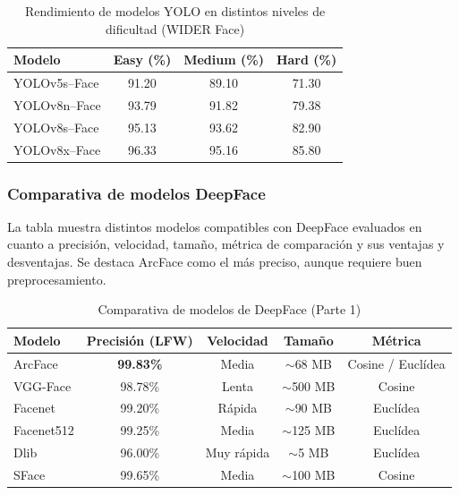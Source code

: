 \begin{table}[H]
    \centering
    \caption{Rendimiento de modelos YOLO en distintos niveles de dificultad (WIDER Face)}
    \label{tab:rendimiento_dificultad}
    \renewcommand{\arraystretch}{1.3}
    \scriptsize
    \begin{tabular}{|p{3.5cm}|c|c|c|}
        \hline
        \textbf{Modelo} & \textbf{Easy (\%)} & \textbf{Medium (\%)} & \textbf{Hard (\%)} \\
        \hline
        YOLOv5s–Face & 91.20 & 89.10 & 71.30 \\
        \hline
        YOLOv8n–Face & 93.79 & 91.82 & 79.38 \\
        \hline
        YOLOv8s–Face & 95.13 & 93.62 & 82.90 \\
        \hline
        YOLOv8x–Face & 96.33 & 95.16 & 85.80 \\
        \hline
    \end{tabular}
\end{table}


\subsubsection*{Comparativa de modelos DeepFace}

La tabla muestra distintos modelos compatibles con DeepFace evaluados en cuanto a precisión, velocidad, tamaño, métrica de comparación y sus ventajas y desventajas. Se destaca ArcFace como el más preciso, aunque requiere buen preprocesamiento.




\begin{table}[H]
    \centering
    \caption{Comparativa de modelos de DeepFace (Parte 1)}
    \label{tab:deepface1}
    \renewcommand{\arraystretch}{1.3}
    \scriptsize
    \begin{tabular}{|p{2.3cm}|c|c|c|c|}
        \hline
        \textbf{Modelo} & \textbf{Precisión (LFW)} & \textbf{Velocidad} & \textbf{Tamaño} & \textbf{Métrica} \\
        \hline
        ArcFace & \textbf{99.83\%} & Media & $\sim$68 MB & Cosine / Euclídea \\
        \hline
        VGG-Face & 98.78\% & Lenta & $\sim$500 MB & Cosine \\
        \hline
        Facenet & 99.20\% & Rápida & $\sim$90 MB & Euclídea \\
        \hline
        Facenet512 & 99.25\% & Media & $\sim$125 MB & Euclídea \\
        \hline
        Dlib & 96.00\% & Muy rápida & $\sim$5 MB & Euclídea \\
        \hline
        SFace & 99.65\% & Media & $\sim$100 MB & Cosine \\
        \hline
    \end{tabular}
\end{table}

